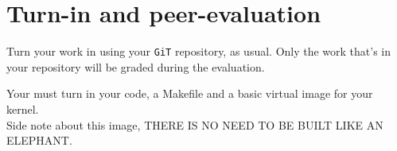 \documentclass{42-en}
\begin{document}
\chapter{Turn-in and peer-evaluation}
    Turn your work in using your \texttt{GiT} repository, as
    usual. Only the work that's in your repository will be graded during
    the evaluation.

    Your must turn in your code, a Makefile and a basic virtual image for your kernel.\\
    Side note about this image,
    THERE IS NO NEED TO BE BUILT LIKE AN ELEPHANT.

\end{document}
